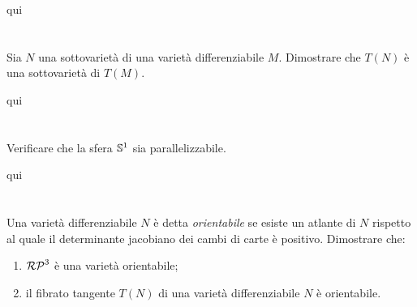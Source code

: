 qui




%

\newpage

%

\section{}\label{es2-25}

\begin{tcolorbox}
	Sia $ N $ una sottovarietà di una varietà differenziabile $ M $. Dimostrare che $ T(N) $ è una sottovarietà di $ T(M) $.
\end{tcolorbox}

qui

%

\newpage

%

\section{}\label{BONUS2-4}

\begin{tcolorbox}
	Verificare che la sfera $ \S^{1} $ sia parallelizzabile.
\end{tcolorbox}

qui

%

\newpage

%

\section{}\label{es2-26}

\begin{tcolorbox}
	Una varietà differenziabile $ N $ è detta \textit{orientabile} se esiste un atlante di $ N $ rispetto al quale il determinante jacobiano dei cambi di carte è positivo. Dimostrare che:
	
	\begin{enumerate}
		\item $ \rp{3} $ è una varietà orientabile;
		\item il fibrato tangente $ T(N) $ di una varietà differenziabile $ N $ è orientabile.
	\end{enumerate}
\end{tcolorbox}

